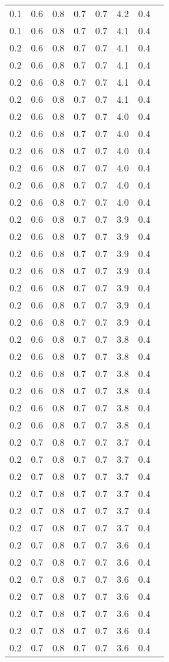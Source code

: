 \begin{tabular}{L{1in}|L{1in}|L{1in}|L{1in}|L{1in}|L{1in}|L{1in}|L{1in}}
0.1&0.6&0.8&0.7&0.7&4.2&0.4\\
0.1&0.6&0.8&0.7&0.7&4.1&0.4\\
0.2&0.6&0.8&0.7&0.7&4.1&0.4\\
0.2&0.6&0.8&0.7&0.7&4.1&0.4\\
0.2&0.6&0.8&0.7&0.7&4.1&0.4\\
0.2&0.6&0.8&0.7&0.7&4.1&0.4\\
0.2&0.6&0.8&0.7&0.7&4.0&0.4\\
0.2&0.6&0.8&0.7&0.7&4.0&0.4\\
0.2&0.6&0.8&0.7&0.7&4.0&0.4\\
0.2&0.6&0.8&0.7&0.7&4.0&0.4\\
0.2&0.6&0.8&0.7&0.7&4.0&0.4\\
0.2&0.6&0.8&0.7&0.7&4.0&0.4\\
0.2&0.6&0.8&0.7&0.7&3.9&0.4\\
0.2&0.6&0.8&0.7&0.7&3.9&0.4\\
0.2&0.6&0.8&0.7&0.7&3.9&0.4\\
0.2&0.6&0.8&0.7&0.7&3.9&0.4\\
0.2&0.6&0.8&0.7&0.7&3.9&0.4\\
0.2&0.6&0.8&0.7&0.7&3.9&0.4\\
0.2&0.6&0.8&0.7&0.7&3.9&0.4\\
0.2&0.6&0.8&0.7&0.7&3.8&0.4\\
0.2&0.6&0.8&0.7&0.7&3.8&0.4\\
0.2&0.6&0.8&0.7&0.7&3.8&0.4\\
0.2&0.6&0.8&0.7&0.7&3.8&0.4\\
0.2&0.6&0.8&0.7&0.7&3.8&0.4\\
0.2&0.6&0.8&0.7&0.7&3.8&0.4\\
0.2&0.7&0.8&0.7&0.7&3.7&0.4\\
0.2&0.7&0.8&0.7&0.7&3.7&0.4\\
0.2&0.7&0.8&0.7&0.7&3.7&0.4\\
0.2&0.7&0.8&0.7&0.7&3.7&0.4\\
0.2&0.7&0.8&0.7&0.7&3.7&0.4\\
0.2&0.7&0.8&0.7&0.7&3.7&0.4\\
0.2&0.7&0.8&0.7&0.7&3.6&0.4\\
0.2&0.7&0.8&0.7&0.7&3.6&0.4\\
0.2&0.7&0.8&0.7&0.7&3.6&0.4\\
0.2&0.7&0.8&0.7&0.7&3.6&0.4\\
0.2&0.7&0.8&0.7&0.7&3.6&0.4\\
0.2&0.7&0.8&0.7&0.7&3.6&0.4\\
0.2&0.7&0.8&0.7&0.7&3.6&0.4\\

\end{tabular}
